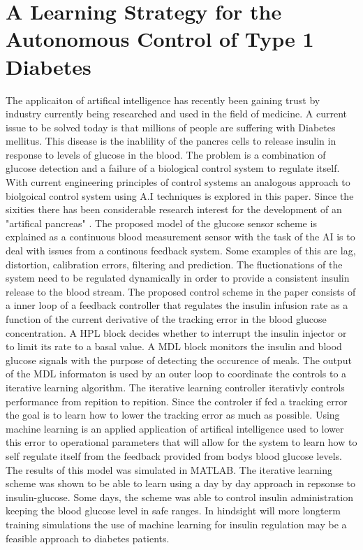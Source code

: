 \documentclass[12pt]{article} %
\begin{document}
\newpage

\section{A Learning Strategy for the Autonomous Control of Type 1 Diabetes} %
The applicaiton of artifical intelligence has recently been gaining trust by industry currently being researched and used in the field of medicine. A current issue to be solved today is that millions of people are suffering with Diabetes mellitus. This disease is the inablility of the pancres cells to release insulin in response to levels of glucose in the blood. The problem is a combination of glucose detection and a failure of a biological control system to regulate itself. With current engineering principles of control systems an analogous approach to biolgoical control system using A.I techniques is explored in this paper. Since the sixities there has been considerable research interest for the development of an "artifical pancreas" \cite{Clemens}. The proposed model of the glucose sensor scheme is explained as a continuous blood measurement sensor with the task of the AI is to deal with issues from a continous feedback system. Some examples of this are lag, distortion, calibration errors, filtering and prediction. The fluctionations of the system need to be regulated dynamically in order to provide a consistent insulin release to the blood stream. The proposed control scheme in the paper consists of a inner loop of a feedback controller that regulates the insulin infusion rate as a function of the current derivative of the tracking error in the blood glucose concentration. A HPL block decides whether to interrupt the insulin injector or to limit its rate to a basal value. A MDL block monitors the insulin and blood glucose signals with the purpose of detecting the occurence of meals. The output of the MDL informaton is used by an outer loop to coordinate the controls to a iterative learning algorithm. The iterative learning controller iterativly controls performance from repition to repition. Since the controler if fed a tracking error the goal is to learn how to lower the tracking error as much as possible. Using machine learning is an applied application of artifical intelligence used to lower this error to operational parameters that will allow for the system to learn how to self regulate itself from the feedback provided from bodys blood glucose levels. The results of this model was simulated in MATLAB. The iterative learning scheme was shown to be able to learn using a day by day approach in repsonse to insulin-glucose. Some days, the scheme was able to control insulin administration keeping the blood glucose level in safe ranges. In hindsight will more longterm training simulations the use of machine learning for insulin regulation may be a feasible approach to diabetes patients.
\newpage
\end{document}
